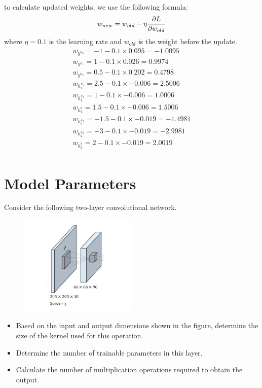 \documentclass[12pt]{article}
\makeatletter
\newcommand*{\rom}[1]{\expandafter\@slowromancap\romannumeral #1@}
\makeatother
\begin{document}
\begin{qsolve}[Part \rom{3}]
    to calculate updated weights, we use the following formula:
    \begin{gather*}
        w_{new} = w_{old} - \eta \pdv{L}{w_{old}}
    \end{gather*}
    where $\eta = 0.1$ is the learning rate and $w_{old}$ is the weight before the update. \\
    \begin{gather*}
        w_{y^{h_0}} = -1 - 0.1 \times 0.095 = -1.0095 \\
        w_{y^{h_1}} = 1 - 0.1 \times 0.026 = 0.9974 \\
        w_{y^{h_2}} = 0.5 - 0.1 \times 0.202 = 0.4798 \\
        w_{h_1^{x_1}} = 2.5 - 0.1 \times -0.006 = 2.5006 \\
        w_{h_1^{x_2}} = 1 - 0.1 \times -0.006 = 1.0006 \\
        w_{h_1^{b}} = 1.5 - 0.1 \times -0.006 = 1.5006 \\
        w_{h_2^{x_1}} = -1.5 - 0.1 \times -0.019 = -1.4981 \\
        w_{h_2^{x_2}} = -3 - 0.1 \times -0.019 = -2.9981 \\
        w_{h_2^{b}} = 2 - 0.1 \times -0.019 = 2.0019 \\
    \end{gather*}
\end{qsolve}

\section{Model Parameters}
Consider the following two-layer convolutional network.
\begin{figure}[h]
    \centering
    \includegraphics[width=0.5\textwidth]{Q5.png}
\end{figure}
\begin{itemize}
    \item Based on the input and output dimensions shown in the figure, determine the size of the kernel used for this operation.
    \item Determine the number of trainable parameters in this layer.
    \item Calculate the number of multiplication operations required to obtain the output.
\end{itemize}
\end{document}
